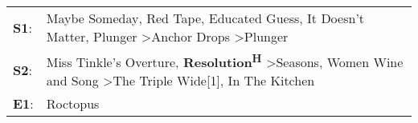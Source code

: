 \begin{supertabular}{p{0.03\textwidth}p{0.92\textwidth}}
 \textbf{S1}:  &  Maybe Someday\textsuperscript{}, \enspace Red Tape\textsuperscript{}, \enspace Educated Guess\textsuperscript{}, \enspace It Doesn't Matter\textsuperscript{}, \enspace Plunger\textsuperscript{} \textgreater \enspace Anchor Drops\textsuperscript{} \textgreater \enspace Plunger\textsuperscript{}  \enspace  \\
 \textbf{S2}:  &         Miss Tinkle's Overture\textsuperscript{}, \enspace \textbf{Resolution\textsuperscript{H}} \textgreater \enspace Seasons\textsuperscript{}, \enspace Women Wine and Song\textsuperscript{} \textgreater \enspace The Triple Wide[1]\textsuperscript{}, \enspace In The Kitchen\textsuperscript{}  \enspace  \\
 \textbf{E1}:  &                                                                                                                                                                                                                                                                              Roctopus\textsuperscript{}  \enspace  \\
\end{supertabular}
